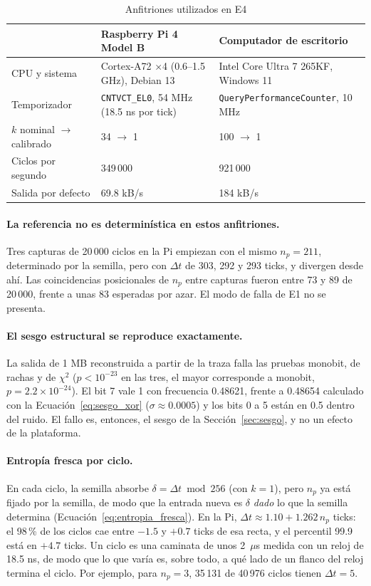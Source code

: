 \begin{table}[H]
\centering
\caption{Anfitriones utilizados en E4}
\label{tab:res_anfitriones}
\begin{tabularx}{\textwidth}{@{}L{0.25\textwidth}XY@{}}
\toprule
& \textbf{Raspberry Pi 4 Model B} & \textbf{Computador de escritorio} \\
\midrule
CPU y sistema & Cortex-A72 ×4 (0.6--1.5 GHz), Debian 13 & Intel Core Ultra 7 265KF, Windows 11 \\
Temporizador & \texttt{CNTVCT\_EL0}, 54 MHz (18.5 ns por tick) & \texttt{QueryPerformanceCounter}, 10 MHz \\
$k$ nominal $\rightarrow$ calibrado & 34 $\rightarrow$ 1 & 100 $\rightarrow$ 1 \\
Ciclos por segundo & 349\,000 & 921\,000 \\
Salida por defecto & 69.8 kB/s & 184 kB/s \\
\bottomrule
\end{tabularx}
\end{table}

\paragraph{La referencia no es determinística en estos anfitriones.} Tres capturas de 20\,000 ciclos en la Pi empiezan con el mismo $n_p = 211$, determinado por la semilla, pero con $\Delta t$ de 303, 292 y 293 ticks, y divergen desde ahí. Las coincidencias posicionales de $n_p$ entre capturas fueron entre 73 y 89 de 20\,000, frente a unas 83 esperadas por azar. El modo de falla de E1 no se presenta.

\paragraph{El sesgo estructural se reproduce exactamente.} La salida de 1 MB reconstruida a partir de la traza falla las pruebas monobit, de rachas y de $\chi^2$ ($p < 10^{-23}$ en las tres, el mayor corresponde a monobit, $p = 2.2 \times 10^{-24}$). El bit 7 vale 1 con frecuencia 0.48621, frente a 0.48654 calculado con la Ecuación~\eqref{eq:sesgo_xor} ($\sigma \approx 0.0005$) y los bits 0 a 5 están en 0.5 dentro del ruido. El fallo es, entonces, el sesgo de la Sección~\ref{sec:sesgo}, y no un efecto de la plataforma.

\paragraph{Entropía fresca por ciclo.} En cada ciclo, la semilla absorbe $\delta = \Delta t \bmod 256$ (con $k = 1$), pero $n_p$ ya está fijado por la semilla, de modo que la entrada nueva es $\delta$ \emph{dado} lo que la semilla determina (Ecuación~\eqref{eq:entropia_fresca}). En la Pi, $\Delta t \approx 1.10 + 1.262\, n_p$ ticks: el 98\,\% de los ciclos cae entre $-1.5$ y $+0.7$ ticks de esa recta, y el percentil 99.9 está en $+4.7$ ticks. Un ciclo es una caminata de unos 2~$\mu$s medida con un reloj de 18.5 ns, de modo que lo que varía es, sobre todo, a qué lado de un flanco del reloj termina el ciclo. Por ejemplo, para $n_p = 3$, 35\,131 de 40\,976 ciclos tienen $\Delta t = 5$.

